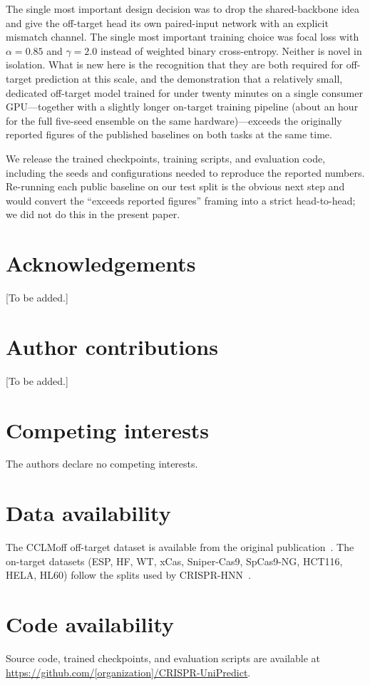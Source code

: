 \documentclass[11pt,a4paper]{article}
\begin{document}
The single most important design decision was to drop the shared-backbone idea and give the off-target head its own paired-input network with an explicit mismatch channel. The single most important training choice was focal loss with $\alpha{=}0.85$ and $\gamma{=}2.0$ instead of weighted binary cross-entropy. Neither is novel in isolation. What is new here is the recognition that they are both required for off-target prediction at this scale, and the demonstration that a relatively small, dedicated off-target model trained for under twenty minutes on a single consumer GPU---together with a slightly longer on-target training pipeline (about an hour for the full five-seed ensemble on the same hardware)---exceeds the originally reported figures of the published baselines on both tasks at the same time.

We release the trained checkpoints, training scripts, and evaluation code, including the seeds and configurations needed to reproduce the reported numbers. Re-running each public baseline on our test split is the obvious next step and would convert the ``exceeds reported figures'' framing into a strict head-to-head; we did not do this in the present paper.

\section*{Acknowledgements}
[To be added.]

\section*{Author contributions}
[To be added.]

\section*{Competing interests}
The authors declare no competing interests.

\section*{Data availability}
The CCLMoff off-target dataset is available from the original publication~\citep{cclmoff}. The on-target datasets (ESP, HF, WT, xCas, Sniper-Cas9, SpCas9-NG, HCT116, HELA, HL60) follow the splits used by CRISPR-HNN~\citep{crispr_hnn}.

\section*{Code availability}
Source code, trained checkpoints, and evaluation scripts are available at \url{https://github.com/[organization]/CRISPR-UniPredict}.
\end{document}
